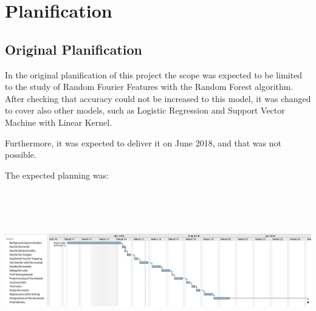 \documentclass{article}
\begin{document}
%
%

\section{Planification}
    \subsection{Original Planification}

    In the original planification of this project the scope was
    expected to be limited to the study of Random Fourier Features with the
    Random Forest algorithm. After checking that accuracy could not be increased
    to this model, it was changed to cover also other models, such as Logistic
    Regression and Support Vector Machine with Linear Kernel.

    Furthermore, it was expected to deliver it on June 2018, and that was not
    possible.

    The expected planning was:

    \hspace*{-3cm}
    \includegraphics[width=17cm, height=7cm]{planning.jpg}
\end{document}
